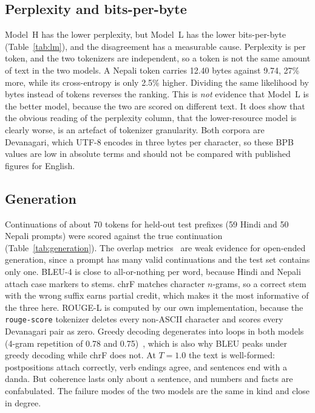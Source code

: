 \documentclass[10pt,a4paper]{article}
\newcommand{\MH}{Model~H}
\newcommand{\ML}{Model~L}
\newcommand{\code}[1]{\texttt{#1}}
\newcommand{\tablefile}[1]{}
\begin{document}
\subsection{Perplexity and bits-per-byte}
\begin{table}[t]
\centering\small
\tablefile{lm}
\caption{Held-out language modelling. CE is in nats per token and BPB in bits per UTF-8 byte. Each model is scored on its own complete split.}
\label{tab:lm}
\end{table}

\MH{} has the lower perplexity, but \ML{} has the lower bits-per-byte (Table~\ref{tab:lm}), and the disagreement has a measurable cause.
Perplexity is per token, and the two tokenizers are independent, so a token is not the same amount of text in the two models.
A Nepali token carries 12.40 bytes against 9.74, 27\% more, while its cross-entropy is only 2.5\% higher. Dividing the same likelihood by bytes instead of tokens reverses the ranking.
This is \emph{not} evidence that \ML{} is the better model, because the two are scored on different text.
It does show that the obvious reading of the perplexity column, that the lower-resource model is clearly worse, is an artefact of tokenizer granularity.
Both corpora are Devanagari, which UTF-8 encodes in three bytes per character, so these BPB values are low in absolute terms and should not be compared with published figures for English.

\subsection{Generation}
Continuations of about 70 tokens for held-out test prefixes (59 Hindi and 50 Nepali prompts) were scored against the true continuation (Table~\ref{tab:generation}).
The overlap metrics~\cite{bleu,chrf,rouge,sacrebleu} are weak evidence for open-ended generation, since a prompt has many valid continuations and the test set contains only one.
BLEU-4 is close to all-or-nothing per word, because Hindi and Nepali attach case markers to stems.
chrF matches character $n$-grams, so a correct stem with the wrong suffix earns partial credit, which makes it the most informative of the three here.
ROUGE-L is computed by our own implementation, because the \code{rouge-score} tokenizer deletes every non-ASCII character and scores every Devanagari pair as zero.
Greedy decoding degenerates into loops in both models (4-gram repetition of 0.78 and 0.75)~\cite{degeneration}, which is also why BLEU peaks under greedy decoding while chrF does not.
At $T{=}1.0$ the text is well-formed: postpositions attach correctly, verb endings agree, and sentences end with a danda. But coherence lasts only about a sentence, and numbers and facts are confabulated.
The failure modes of the two models are the same in kind and close in degree.
\end{document}
